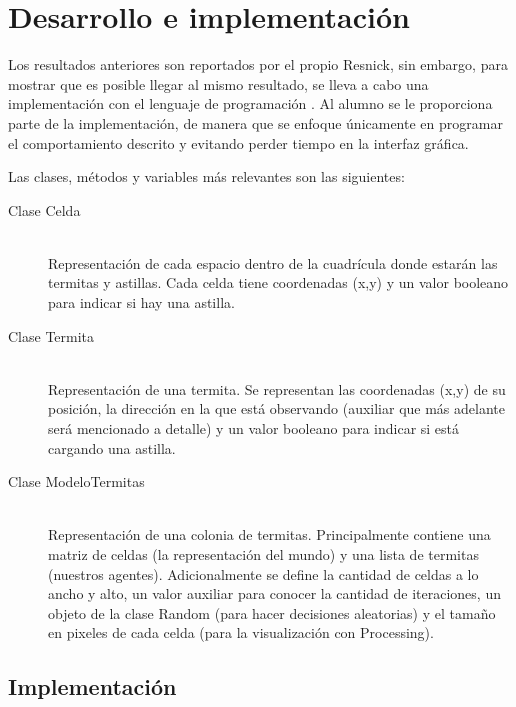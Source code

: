 \section{Desarrollo e implementaci\'on}


Los resultados anteriores son reportados por el propio Resnick, sin embargo, para mostrar que es posible llegar al mismo resultado, se lleva a cabo una implementación con el lenguaje de programación .
Al alumno se le proporciona parte de la implementación, de manera que se enfoque únicamente en programar el comportamiento descrito y evitando perder tiempo en la interfaz gráfica.

Las clases, métodos y variables más relevantes son las siguientes:

\begin{description}%
  \item[Clase Celda] \hfill \\
    Representación de cada espacio dentro de la cuadrícula donde estarán las termitas y astillas.
    Cada celda tiene coordenadas (x,y) y un valor booleano para indicar si hay una astilla.

  \item[Clase Termita] \hfill \\
    Representación de una termita. Se representan las coordenadas (x,y) de su posición, la dirección en la que está observando (auxiliar que más adelante será mencionado a detalle) y un valor booleano para indicar si está cargando una astilla.

  \item[Clase ModeloTermitas] \hfill \\
    Representación de una colonia de termitas. Principalmente contiene una matriz de celdas (la representación del mundo) y una lista de termitas (nuestros agentes). Adicionalmente se define la cantidad de celdas a lo ancho y alto, un valor auxiliar para conocer la cantidad de iteraciones, un objeto de la clase Random (para hacer decisiones aleatorias) y el tamaño en pixeles de cada celda (para la visualización con Processing).
\end{description}

\subsection{Implementaci\'on}

